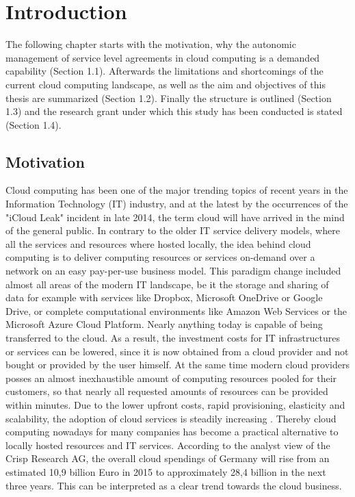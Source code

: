 
\chapter{Introduction} %
\label{Introduction} %
The following chapter starts with the motivation, why the autonomic management of service level agreements in cloud computing is a demanded capability (Section 1.1). Afterwards the limitations and shortcomings of the current cloud computing landscape, as well as the aim and objectives of this thesis are summarized (Section 1.2). Finally the structure is outlined (Section 1.3) and the research grant under which this study has been conducted is stated (Section 1.4).  

\section{Motivation}
Cloud computing has been one of the major trending topics of recent years in the Information Technology (IT) industry, and at the latest by the occurrences of the "iCloud Leak" incident in late 2014\cite{icloud}, the term cloud will have arrived in the mind of the general public. In contrary to the older IT service delivery models, where all the services and resources where hosted locally, the idea behind cloud computing is to deliver computing resources or services on-demand over a network on an easy pay-per-use business model\cite{NIST}. This paradigm change included almost all areas of the modern IT landscape, be it the storage and sharing of data for example with services like Dropbox\cite{Dropbox}, Microsoft OneDrive\cite{OneDrive} or Google Drive\cite{GoogleDrive}, or complete computational environments like Amazon Web Services\cite{AWS} or the Microsoft Azure Cloud Platform\cite{Azure}. Nearly anything today is capable of being transferred to the cloud. As a result,  the investment costs for IT infrastructures or services can be lowered, since it is now obtained from a cloud provider and not bought or provided by the user himself. At the same time modern cloud providers posses an almost inexhaustible amount of computing resources pooled for their customers, so that nearly all requested amounts of resources can be provided within minutes.  Due to the lower upfront costs, rapid provisioning, elasticity and scalability, the adoption of cloud services is steadily increasing \cite{IDC}. Thereby cloud computing nowadays for many companies has become a practical alternative to locally hosted resources and IT services. According to the analyst view of the Crisp Research AG\cite{crisp}, the overall cloud spendings of Germany will rise from an estimated 10,9 billion Euro in 2015 to approximately 28,4 billion in the next three years. This can be interpreted as a clear trend towards the cloud business. 

